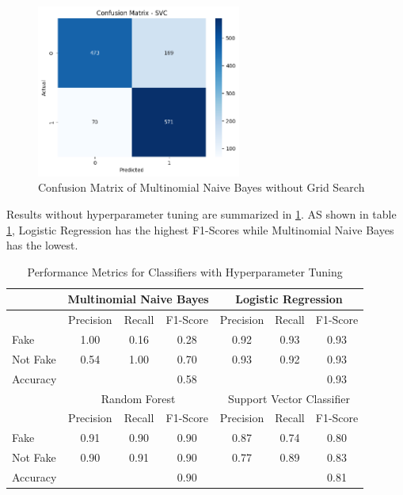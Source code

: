 \begin{figure}[h!]
    \centering
    \includegraphics[width=0.6\textwidth,height=0.6\textheight, keepaspectratio]{figures/hyperparam/SVC_default.png}
        \caption{Confusion Matrix of Multinomial Naive Bayes without Grid Search}
        \label{SVC_default}
\end{figure}

Results without hyperparameter tuning are summarized in \ref{tab:no_hyperparam_summary}. AS shown in table \ref{tab:no_hyperparam_summary}, Logistic Regression has the highest F1-Scores while Multinomial Naive Bayes has the lowest.

\begin{table}[ht]
    \centering
    \begin{tabular}{|l|ccc|ccc|}
    \hline
    & \multicolumn{3}{c|}{Multinomial Naive Bayes} & \multicolumn{3}{c|}{Logistic Regression} \\
    \hline
    & Precision & Recall & F1-Score & Precision & Recall & F1-Score \\
    \hline
    Fake & 1.00 & 0.16 & 0.28 & 0.92 & 0.93 & 0.93 \\
    Not Fake & 0.54 & 1.00 & 0.70 & 0.93 & 0.92 & 0.93 \\
    Accuracy & & & 0.58 & & & 0.93 \\
    \hline
    & \multicolumn{3}{c|}{Random Forest} & \multicolumn{3}{c|}{Support Vector Classifier} \\
    \hline
    & Precision & Recall & F1-Score & Precision & Recall & F1-Score \\
    \hline
    Fake & 0.91 & 0.90 & 0.90 & 0.87 & 0.74 & 0.80 \\
    Not Fake & 0.90 & 0.91 & 0.90 & 0.77 & 0.89 & 0.83 \\
    Accuracy & & & 0.90 & & & 0.81 \\
    \hline
    \end{tabular}
    \caption{Performance Metrics for Classifiers with Hyperparameter Tuning}
    \label{tab:no_hyperparam_summary}
\end{table}



